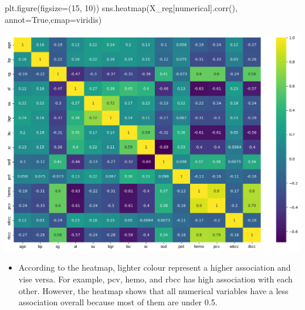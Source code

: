\documentclass[
  11pt,
  letterpaper,
  DIV=11,
  numbers=noendperiod]{scrartcl}
\newenvironment{Shaded}{\begin{snugshade}}{\end{snugshade}}
\newcommand{\DecValTok}[1]{\textcolor[rgb]{0.68,0.00,0.00}{#1}}
\newcommand{\NormalTok}[1]{\textcolor[rgb]{0.00,0.23,0.31}{#1}}
\newcommand{\OperatorTok}[1]{\textcolor[rgb]{0.37,0.37,0.37}{#1}}
\newcommand{\StringTok}[1]{\textcolor[rgb]{0.13,0.47,0.30}{#1}}
\newcommand{\VariableTok}[1]{\textcolor[rgb]{0.07,0.07,0.07}{#1}}
\providecommand{\tightlist}{%
  \setlength{\itemsep}{0pt}\setlength{\parskip}{0pt}}\usepackage{longtable,booktabs,array}
\begin{document}
\begin{Shaded}
\begin{Highlighting}[]
\NormalTok{plt.figure(figsize}\OperatorTok{=}\NormalTok{(}\DecValTok{15}\NormalTok{, }\DecValTok{10}\NormalTok{))}
\NormalTok{sns.heatmap(X\_reg[numerical].corr(), annot}\OperatorTok{=}\VariableTok{True}\NormalTok{,cmap}\OperatorTok{=}\StringTok{\textquotesingle{}viridis\textquotesingle{}}\NormalTok{)}
\end{Highlighting}
\end{Shaded}

\includegraphics{assignment6111_files/figure-pdf/cell-18-output-1.png}

\begin{itemize}
\tightlist
\item
  According to the heatmap, lighter colour represent a higher
  association and vise versa. For example, pcv, hemo, and rbcc has high
  association with each other. However, the heatmap shows that all
  numerical variables have a less association overall because most of
  them are under 0.5.
\end{itemize}
\end{document}
